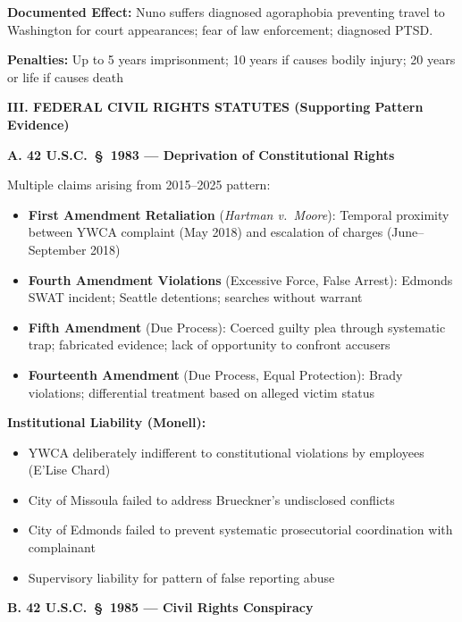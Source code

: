 \documentclass[11pt, letterpaper]{article}
\newcommand{\sectiontitle}[1]{\vspace{0.2in}\noindent\textcolor{NavyBlue}{\large\textbf{#1}}\vspace{0.1in}}
\newcommand{\subsectiontitle}[1]{\vspace{0.15in}\noindent\textcolor{NavyBlue}{\textbf{#1}}\vspace{0.05in}}
\begin{document}
\textbf{Documented Effect:} Nuno suffers diagnosed agoraphobia preventing travel to Washington for court appearances; fear of law enforcement; diagnosed PTSD.

\textbf{Penalties:} Up to 5 years imprisonment; 10 years if causes bodily injury; 20 years or life if causes death

\sectiontitle{III. FEDERAL CIVIL RIGHTS STATUTES (Supporting Pattern Evidence)}

\subsectiontitle{A. 42 U.S.C.\ \S\ 1983 --- Deprivation of Constitutional Rights}

Multiple claims arising from 2015--2025 pattern:
\begin{itemize}[leftmargin=*,itemsep=2pt]
    \item \textbf{First Amendment Retaliation} (\textit{Hartman v.\ Moore}): Temporal proximity between YWCA complaint (May 2018) and escalation of charges (June--September 2018)
    \item \textbf{Fourth Amendment Violations} (Excessive Force, False Arrest): Edmonds SWAT incident; Seattle detentions; searches without warrant
    \item \textbf{Fifth Amendment} (Due Process): Coerced guilty plea through systematic trap; fabricated evidence; lack of opportunity to confront accusers
    \item \textbf{Fourteenth Amendment} (Due Process, Equal Protection): Brady violations; differential treatment based on alleged victim status
\end{itemize}

\textbf{Institutional Liability (Monell):}
\begin{itemize}[leftmargin=*,itemsep=2pt]
    \item YWCA deliberately indifferent to constitutional violations by employees (E'Lise Chard)
    \item City of Missoula failed to address Brueckner's undisclosed conflicts
    \item City of Edmonds failed to prevent systematic prosecutorial coordination with complainant
    \item Supervisory liability for pattern of false reporting abuse
\end{itemize}

\subsectiontitle{B. 42 U.S.C.\ \S\ 1985 --- Civil Rights Conspiracy}
\end{document}
